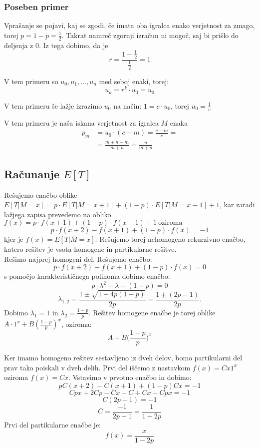 \documentclass[12pt, a4paper]{article}
\begin{document}
\subsubsection{Poseben primer}
Vprašanje se pojavi, kaj se zgodi, če imata oba igralca enako verjetnost za zmago, torej $p = 1 - p = \frac{1}{2}$. Takrat namreč zgornji izračun ni mogoč, saj bi prišlo do deljenja z $0$. Iz tega dobimo, da je 
$$r = \frac{1 - \frac{1}{2}}{\frac{1}{2}} = 1$$

V tem primeru so $u_0, u_1, \dotso, u_n$ med seboj enaki, torej:
$$u_k = r^k \cdot u_0 = u_0$$

V tem primeru še lažje izrazimo $u_0$ na način:
$1 = c\cdot u_0$, torej $u_0 = \frac{1}{c}$

V tem primeru je naša iskana verjetnost za igralca $M$ enaka
\begin{equation*}
\begin{split}
p_m &= u_0 \cdot (c - m) = \frac{c-m}{c} = \\
		&= \frac{m + n - m}{m + n} = \frac{n}{m + n}
\end{split} 
\end{equation*}



\subsection{Računanje $E[T]$}

Rešujemo enačbo oblike $E[T|M=x] = p\cdot E[T|M=x+1] + (1-p)\cdot E[T|M=x-1] + 1$, kar zaradi lažjega zapisa prevedemo na obliko $f(x) = p\cdot f(x+1) + (1-p) \cdot f(x-1) + 1 ~ \textrm{oziroma} $ $$p\cdot f(x+2) - f(x+1) + (1-p)\cdot f(x) = -1$$ kjer je $f(x)=E[T|M=x]$. Rešujemo torej nehomogeno rekurzivno enačbo, katero rešitev je vsota homogene in partikularne rešitve. 
\\
Rešimo najprej homogeni del. Rešujemo enačbo: $$p\cdot f(x+2) - f(x+1) + (1-p)\cdot f(x) = 0$$ s pomočjo karakterističnega polinoma dobimo enačbo: $$p\cdot  \lambda ^2 - \lambda + (1-p) = 0$$ $$\lambda _{1, 2}= \frac{1 \pm \sqrt{1 - 4p(1-p)}}{2p} = \frac{1 \pm (2p-1)}{2p}.$$
Dobimo $\lambda _{1} = 1$ in $\lambda _{2} = \frac{1-p}{p}$. Rešitev homogene enačbe je torej oblike $A\cdot 1^x + B(\frac{1-p}{p})^x$, oziroma: $$A+ B \bigg( \frac{1-p}{p} \bigg )^x$$

Ker imamo homogeno rešitev sestavljeno iz dveh delov, bomo partikularni del prav tako poiskali v dveh delih. Prvi del iščemo z nastavkom $f(x)= Cx1^x$ oziroma $f(x)= Cx$. Vstavimo v prvotno enačbo in dobimo: $$pC(x+2)-C(x+1)+(1-p)Cx=-1$$ $$Cpx+2Cp-Cx-C+Cx-Cpx=-1$$ $$C(2p-1)=-1$$ $$C=\frac{-1}{2p-1} = \frac{1}{1-2p}$$ Prvi del partikularne enačbe je: $$f(x)=\frac{x}{1-2p}$$
\end{document}
